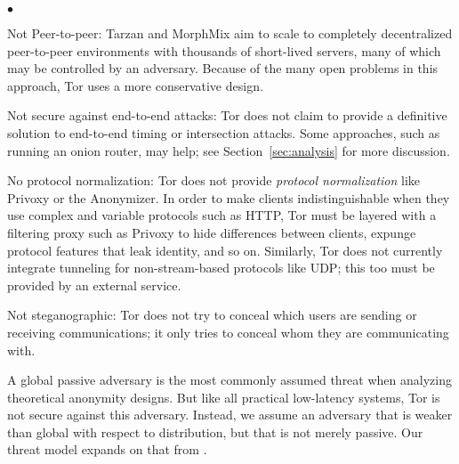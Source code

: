\documentclass[times,10pt,twocolumn]{article}
\newenvironment{tightlist}{\begin{list}{$\bullet$}{
  \setlength{\itemsep}{0mm}
    \setlength{\parsep}{0mm}
    }}{\end{list}}
\begin{document}
\begin{tightlist}
\item[Not Peer-to-peer:] Tarzan and MorphMix aim to
  scale to completely decentralized peer-to-peer environments with thousands
  of short-lived servers, many of which may be controlled by an adversary.
  Because of the many open problems in this approach, Tor uses a more
  conservative design.
\item[Not secure against end-to-end attacks:] Tor does not claim to provide a
  definitive solution to end-to-end timing or intersection attacks. Some
  approaches, such as running an onion router, may help; see
  Section~\ref{sec:analysis} for more discussion.
\item[No protocol normalization:] Tor does not provide \emph{protocol
  normalization} like Privoxy or the Anonymizer.  In order to make clients
  indistinguishable when they use complex and variable protocols such as HTTP,
  Tor must be layered with a filtering proxy such as Privoxy to hide
  differences between clients, expunge protocol features that leak identity,
  and so on.  Similarly, Tor does not currently integrate tunneling for
  non-stream-based protocols like UDP; this too must be provided by
  an external service.
\item[Not steganographic:] Tor does not try to conceal which users are
  sending or receiving communications; it only tries to conceal whom they are
  communicating with.
\end{tightlist}

\label{subsec:threat-model}

A global passive adversary is the most commonly assumed threat when
analyzing theoretical anonymity designs. But like all practical low-latency
systems, Tor is not secure against this adversary.  Instead, we assume an
adversary that is weaker than global with respect to distribution, but that
is not merely passive.  Our threat model expands on that from
\cite{or-pet00}.
\end{document}

